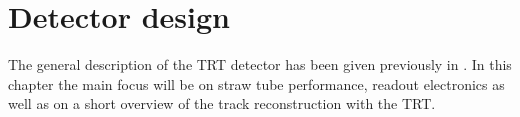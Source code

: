 \section{Detector design}
\label{sec:trt_straw_hw}

The general description of the TRT detector has been given previously in .
In this chapter the main focus will be on straw tube performance, readout electronics as well as on a short overview of the track reconstruction with the TRT.





